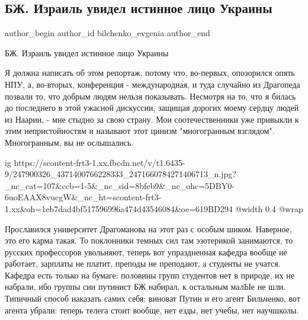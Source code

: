  
 
 
 
 
 
\subsection{БЖ. Израиль увидел истинное лицо Украины}
\label{sec:23_10_2021.fb.bilchenko_evgenia.4.izrail_lico_ukraincy}
 
\ifcmt
 author_begin
   author_id bilchenko_evgenia
 author_end
\fi

БЖ. Израиль увидел истинное лицо Украины

Я должна написать об этом репортаж, потому что, во-первых, опозорился опять
НПУ, а, во-вторых, конференция - международная, и туда случайно из Драгопеда
позвали то, что добрым людям нельзя показывать. Несмотря на то, что я билась до
последнего в этой ужасной дискуссии, защищая дорогих моему сердцу людей из
Наарии, - мне стыдно за свою страну. Мои соотечественники уже привыкли к этим
непристойностям и называют этот цинизм "многогранным взглядом". Многогранным,
вы не ослышались.

\ifcmt
  ig https://scontent-frt3-1.xx.fbcdn.net/v/t1.6435-9/247900326_4371400766228333_2471660784271406713_n.jpg?_nc_cat=107&ccb=1-5&_nc_sid=8bfeb9&_nc_ohc=5DBY0-6uoEAAX8vucgW&_nc_ht=scontent-frt3-1.xx&oh=1eb7dad4bf517596996a474d43546084&oe=619BD294
  @width 0.4
  @wrap 
\fi

Прославился университет Драгоманова на этот раз с особым шиком. Наверное, это
его карма такая. То поклонники темных сил там эзотерикой занимаются, то русских
профессоров увольняют, теперь вот упраздненная кафедра вообще не работает,
зарплаты не платит, преподы не преподают, а студенты не учатся. Кафедра есть
только на бумаге: половины групп студентов нет в природе, их не набрали, ибо
группы сии путинист БЖ набирал, к остальным малЫе не шли. Типичный способ
наказать самих себя: виноват Путин и его агент Бильченко, вот агента убрали:
теперь телега стоит вообще, нет езды, нет учебы, нет научшколы.

